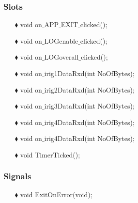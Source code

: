 \subsubsection{Slots}
\begin{enumerate}
	\item [$\blacklozenge$] void on$\_$APP$\_$EXIT$\_$clicked();
	\item [$\blacklozenge$] void on$\_$LOGenable$\_$clicked();
	\item [$\blacklozenge$] void on$\_$LOGoverall$\_$clicked();
	\item [$\blacklozenge$] void on$\_$irig1DataRxd(int NoOfBytes);
	\item [$\blacklozenge$] void on$\_$irig2DataRxd(int NoOfBytes);
	\item [$\blacklozenge$] void on$\_$irig3DataRxd(int NoOfBytes);
	\item [$\blacklozenge$] void on$\_$irig4DataRxd(int NoOfBytes);
	\item [$\blacklozenge$] void on$\_$irig4DataRxd(int NoOfBytes);
	\item [$\blacklozenge$] void TimerTicked();
	
	
\end{enumerate}

\subsubsection{Signals}
\begin{enumerate}
	\item [$\blacklozenge$] void ExitOnError(void);

	
\end{enumerate}

